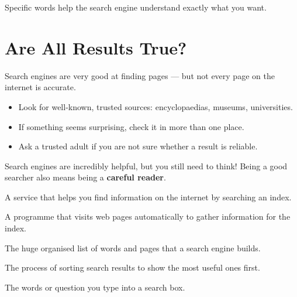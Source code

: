 Specific words help the search engine understand exactly what you want.

\sectionrule

\section*{Are All Results True?}

Search engines are very good at finding pages — but not every page on the internet is accurate.

\begin{itemize}
  \item Look for well-known, trusted sources: encyclopaedias, museums, universities.
  \item If something seems surprising, check it in more than one place.
  \item Ask a trusted adult if you are not sure whether a result is reliable.
\end{itemize}

\begin{bigidea}
  Search engines are incredibly helpful, but you still need to think!
  Being a good searcher also means being a \textbf{careful reader}.
\end{bigidea}

\sectionrule

\begin{newwords}
  \begin{description}[labelwidth=3.2cm, leftmargin=3.4cm]
    \item[\term{Search engine}] A service that helps you find information on the internet by searching an index.
    \item[\term{Crawler}]       A programme that visits web pages automatically to gather information for the index.
    \item[\term{Index}]         The huge organised list of words and pages that a search engine builds.
    \item[\term{Ranking}]       The process of sorting search results to show the most useful ones first.
    \item[\term{Query}]         The words or question you type into a search box.
  \end{description}
\end{newwords}

\sectionrule

